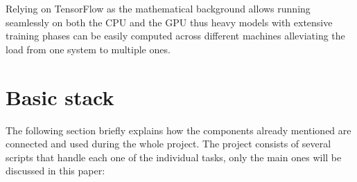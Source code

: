 Relying on TensorFlow as the mathematical background allows running seamlessly on both the CPU and the GPU thus heavy models with extensive training phases can be easily computed across different machines alleviating the load from one system to multiple ones.

\newpage

\section{Basic stack}
The following section briefly explains how the components already mentioned are connected and used during the whole project.
The project consists of several scripts that handle each one of the individual tasks, only the main ones will be discussed in this paper:

